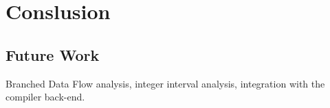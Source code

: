 \chapter{Conslusion}

    \section{Future Work}
    Branched Data Flow analysis, integer interval analysis, integration with the compiler back-end.